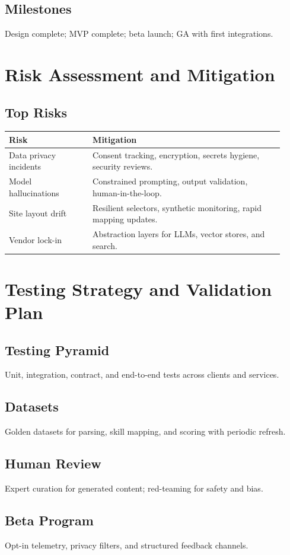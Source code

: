 \documentclass[12pt,a4paper]{article}
\begin{document}
\subsection{Milestones}
Design complete; MVP complete; beta launch; GA with first integrations.

\section{Risk Assessment and Mitigation}
\subsection{Top Risks}
\begin{longtable}{p{0.28\linewidth} p{0.64\linewidth}}
\toprule
\textbf{Risk} & \textbf{Mitigation}\\
\midrule
Data privacy incidents & Consent tracking, encryption, secrets hygiene, security reviews.\\
Model hallucinations & Constrained prompting, output validation, human-in-the-loop.\\
Site layout drift & Resilient selectors, synthetic monitoring, rapid mapping updates.\\
Vendor lock-in & Abstraction layers for LLMs, vector stores, and search.\\
\bottomrule
\end{longtable}

\section{Testing Strategy and Validation Plan}
\subsection{Testing Pyramid}
Unit, integration, contract, and end-to-end tests across clients and services.
\subsection{Datasets}
Golden datasets for parsing, skill mapping, and scoring with periodic refresh.
\subsection{Human Review}
Expert curation for generated content; red-teaming for safety and bias.
\subsection{Beta Program}
Opt-in telemetry, privacy filters, and structured feedback channels.
\end{document}
